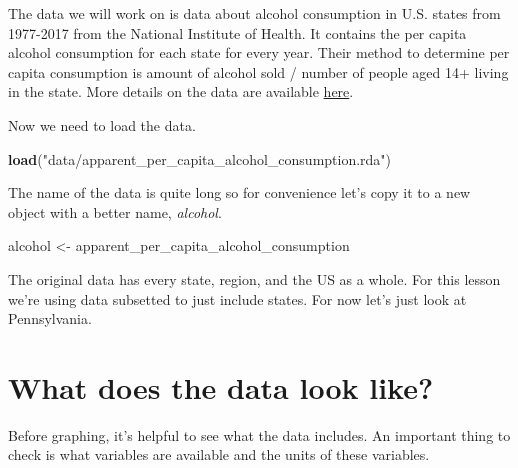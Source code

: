 \documentclass[
  12pt,
]{book}
\newenvironment{Shaded}{\begin{snugshade}}{\end{snugshade}}
\newcommand{\KeywordTok}[1]{\textcolor[rgb]{0.27,0.27,0.27}{\textbf{#1}}}
\newcommand{\NormalTok}[1]{#1}
\newcommand{\OperatorTok}[1]{\textcolor[rgb]{0.43,0.43,0.43}{\textbf{#1}}}
\newcommand{\StringTok}[1]{\textcolor[rgb]{0.5,0.5,0.5}{#1}}
\begin{document}
The data we will work on is data about alcohol consumption in U.S. states from 1977-2017 from the National Institute of Health. It contains the per capita alcohol consumption for each state for every year. Their method to determine per capita consumption is amount of alcohol sold / number of people aged 14+ living in the state. More details on the data are available \href{https://www.openicpsr.org/openicpsr/project/105583/version/V2/view}{here}.

Now we need to load the data.

\begin{Shaded}
\begin{Highlighting}[]
\KeywordTok{load}\NormalTok{(}\StringTok{"data/apparent\_per\_capita\_alcohol\_consumption.rda"}\NormalTok{)}
\end{Highlighting}
\end{Shaded}

The name of the data is quite long so for convenience let's copy it to a new object with a better name, \emph{alcohol}.

\begin{Shaded}
\begin{Highlighting}[]
\NormalTok{alcohol \textless{}{-}}\StringTok{ }\NormalTok{apparent\_per\_capita\_alcohol\_consumption}
\end{Highlighting}
\end{Shaded}

The original data has every state, region, and the US as a whole. For this lesson we're using data subsetted to just include states. For now let's just look at Pennsylvania.

\begin{Shaded}
\end{Shaded}

\hypertarget{what-does-the-data-look-like}{%
\section{What does the data look like?}\label{what-does-the-data-look-like}}

Before graphing, it's helpful to see what the data includes. An important thing to check is what variables are available and the units of these variables.
\end{document}
